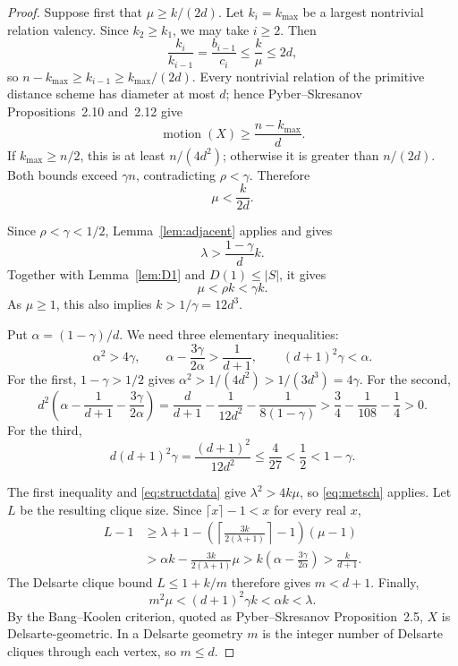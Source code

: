 \documentclass[11pt]{amsart}
\theoremstyle{definition}
\newcommand{\mot}{\operatorname{motion}}
\newcommand{\gam}{\gamma}
\begin{document}
\begin{proof}
Suppose first that $\mu\ge k/(2d)$.  Let $k_i=k_{\max}$ be a largest nontrivial relation valency.  Since $k_2\ge k_1$, we may take $i\ge2$.  Then
\[
  \frac{k_i}{k_{i-1}}=\frac{b_{i-1}}{c_i}\le\frac{k}{\mu}\le2d,
\]
so $n-k_{\max}\ge k_{i-1}\ge k_{\max}/(2d)$.  Every nontrivial relation of the primitive distance scheme has diameter at most $d$; hence Pyber--Skresanov Propositions~2.10 and~2.12 give
\[
  \mot(X)\ge\frac{n-k_{\max}}{d}.
\]
If $k_{\max}\ge n/2$, this is at least $n/(4d^2)$; otherwise it is greater than $n/(2d)$.  Both bounds exceed $\gam n$, contradicting $\rho<\gam$.  Therefore
\begin{equation}\label{eq:musmallpre}
  \mu<\frac{k}{2d}.
\end{equation}

Since $\rho<\gam<1/2$, Lemma~\ref{lem:adjacent} applies and gives
\[
  \lambda>\frac{1-\gam}{d}k.
\]
Together with Lemma~\ref{lem:D1} and $D(1)\le|S|$, it gives
\[
  \mu<\rho k<\gam k.
\]
As $\mu\ge1$, this also implies $k>1/\gam=12d^3$.

Put $\alpha=(1-\gam)/d$.  We need three elementary inequalities:
\begin{equation}\label{eq:threeconstants}
  \alpha^2>4\gam,
  \qquad
  \alpha-\frac{3\gam}{2\alpha}>\frac1{d+1},
  \qquad
  (d+1)^2\gam<\alpha.
\end{equation}
For the first, $1-\gam>1/2$ gives $\alpha^2>1/(4d^2)>1/(3d^3)=4\gam$.  For the second,
\[
 d^2\left(\alpha-\frac1{d+1}-\frac{3\gam}{2\alpha}\right)
 =\frac{d}{d+1}-\frac1{12d^2}-\frac{1}{8(1-\gam)}
 >\frac34-\frac1{108}-\frac14>0.
\]
For the third,
\[
  d(d+1)^2\gam=\frac{(d+1)^2}{12d^2}\le\frac4{27}<\frac12<1-\gam.
\]

The first inequality and \eqref{eq:structdata} give $\lambda^2>4k\mu$, so \eqref{eq:metsch} applies.  Let $L$ be the resulting clique size.  Since $\lceil x\rceil-1<x$ for every real $x$,
\begin{align*}
 L-1
 &\ge \lambda+1-
 \left(\left\lceil\frac{3k}{2(\lambda+1)}\right\rceil-1\right)(\mu-1)\\
 &>\alpha k-\frac{3k}{2(\lambda+1)}\mu
 >k\left(\alpha-\frac{3\gam}{2\alpha}\right)
 >\frac{k}{d+1}.
\end{align*}
The Delsarte clique bound $L\le1+k/m$ therefore gives $m<d+1$.  Finally,
\[
  m^2\mu<(d+1)^2\gam k<\alpha k<\lambda.
\]
By the Bang--Koolen criterion, quoted as Pyber--Skresanov Proposition~2.5, $X$ is Delsarte-geometric.  In a Delsarte geometry $m$ is the integer number of Delsarte cliques through each vertex, so $m\le d$.
\end{proof}
\end{document}
